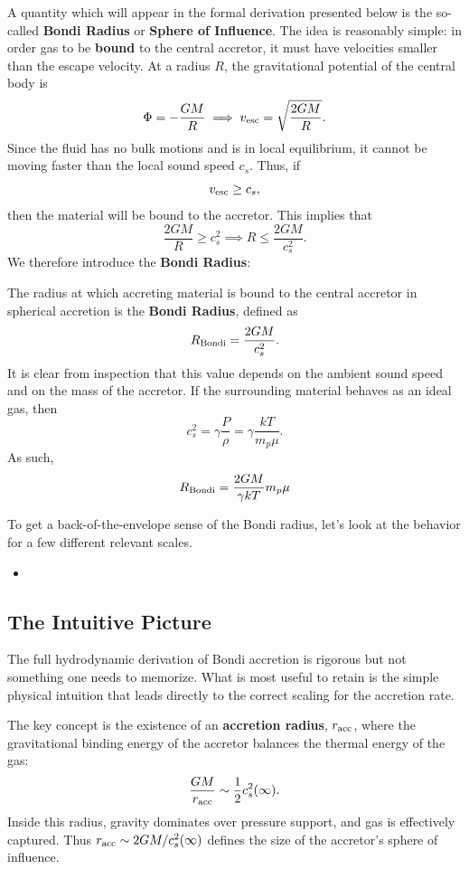 A quantity which will appear in the formal derivation presented below is the so-called \textbf{Bondi Radius} or \textbf{Sphere of Influence}. The idea is reasonably simple: in order gas to be \textbf{bound} to the central accretor, it must have velocities smaller than the escape velocity. At a radius $R$, the gravitational potential of the central body is
\[
\Phi = - \frac{GM}{R} \implies v_{\rm esc} = \sqrt{\frac{2GM}{R}}.
\]
Since the fluid has no bulk motions and is in local equilibrium, it cannot be moving faster than the local sound speed $c_s$. Thus, if 
\[
v_{\rm esc} \ge c_s,
\]
then the material will be bound to the accretor. This implies that
\[
\frac{2GM}{R} \ge c_s^2 \implies R \le \frac{2GM}{c_s^2}.
\]
We therefore introduce the \textbf{Bondi Radius}:
\vspace{20pt}
\begin{definition}
    \label{def:bondi_radius}
    The radius at which accreting material is bound to the central accretor in spherical accretion is the \textbf{Bondi Radius}, defined as
    \begin{equation}
        \label{eq:bondi_radius}
        R_{\rm Bondi} = \frac{2GM}{c_s^2}.
    \end{equation}
It is clear from inspection that this value depends on the ambient sound speed and on the mass of the accretor. If the surrounding material behaves as an ideal gas, then
\[
c_s^2 = \gamma \frac{P}{\rho} = \gamma \frac{kT}{m_p\mu}.
\]
As such,
\[
R_{\rm Bondi} = \frac{2GM}{\gamma kT} m_p\mu
\]
\end{definition}
\vspace{20pt}
To get a back-of-the-envelope sense of the Bondi radius, let's look at the behavior for a few different relevant scales.
\begin{itemize}
    \item 
\end{itemize}



\subsection{The Intuitive Picture}

The full hydrodynamic derivation of Bondi accretion is rigorous but not something one
needs to memorize. What is most useful to retain is the simple physical intuition that
leads directly to the correct scaling for the accretion rate.

\par
The key concept is the existence of an \textbf{accretion radius}, $r_{\rm acc}$, where
the gravitational binding energy of the accretor balances the thermal energy of the gas:
\[
\frac{GM}{r_{\rm acc}} \sim \frac{1}{2}c_s^2(\infty).
\]
Inside this radius, gravity dominates over pressure support, and gas is effectively
captured. Thus $r_{\rm acc} \sim 2GM/c_s^2(\infty)$ defines the size of the accretor's
sphere of influence.

